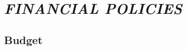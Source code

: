 


% 

\hypertarget{financial-policies}{%
 \section{\texorpdfstring{\emph{FINANCIAL
     POLICIES}}{FINANCIAL POLICIES}}
 \label{financial-policies}}

\hypertarget{budget}{%
 \subsection{Budget}
 \label{budget}}
